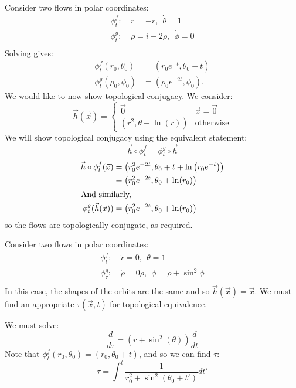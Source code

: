 \documentclass[../Main.tex]{subfiles}
\begin{document}
\begin{example}
    Consider two flows in polar coordinates:
    \begin{align*}
        \phi^f_t: &~\dot{r} = -r,~~\dot{\theta} = 1 \\
        \phi^g_t: &~\dot{\rho} = i-2\rho,~~\dot{\phi} = 0 \\
    \end{align*}
    Solving gives:
    \begin{align*}
        \phi_t^f(r_0, \theta_0) &= \left(r_0 e^{-t}, \theta_0 + t\right) \\
        \phi_t^g(\rho_0, \phi_0) &= \left(\rho_0 e^{-2t},\phi_0\right).
    \end{align*}
    We would like to now show topological conjugacy. We consider:
    \begin{equation*}
        \vec{h}(\vec{x}) =
        \begin{cases}
            \vec0 & \vec{x} = \vec0 \\
            (r^2, \theta + \ln(r)) & \text{otherwise}
        \end{cases}
    \end{equation*}
    We will show topological conjugacy using the equivalent statement:
    \begin{equation*}
        \vec{h} \circ \phi^f_t = \phi_t^g \circ \vec{h}
        \label{RTP} %
    \end{equation*}
    \begin{align*}
        \vec{h} \circ \phi^f_t(\vec{x}) &= \left(r_0^2 e^{-2t}, \theta_0 + t + \ln\left(r_0 e^{-t}\right)\right) \\
        &= \left(r_0^2 e^{-2t}, \theta_0 + \ln(r_0)\right) \\
        \intertext{And similarly,}
        \phi^g_t(\vec{h}(\vec{x})) &= \left(r_0^2 e^{-2t}, \theta_0 + \ln(r_0)\right)
    \end{align*}
    so the flows are topologically conjugate, as required.
\end{example}
\begin{example}
    Consider two flows in polar coordinates:
    \begin{align*}
        \phi^f_t: &~\dot{r} = 0,~~\dot{\theta} = 1 \\
        \phi^g_\tau: &~\dot{\rho} = 0\rho,~~\dot{\phi} = \rho + \sin^2\phi \\
    \end{align*}
    In this case, the shapes of the orbits are the same and so $\vec{h}(\vec{x}) = \vec{x}$. We must find an appropriate $\tau(\vec{x}, t)$ for topological equivalence.

    We must solve:
    \begin{equation*}
        \frac{d}{d\tau} = (r + \sin^2(\theta)) \frac{d}{dt}
    \end{equation*}
    Note that $\phi_t^f(r_0, \theta_0) = (r_0, \theta_0 + t)$, and so we can find $\tau$:
    \begin{equation*}
        \tau = \int^t \frac{1}{r_0^2 + \sin^2(\theta_0 + t')} dt'
    \end{equation*}
\end{example}
\end{document}
